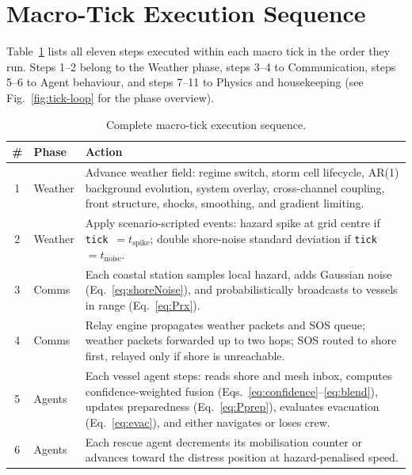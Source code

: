 \documentclass[cameraready]{Interspeech}
\begin{document}
\appendix

\section{Macro-Tick Execution Sequence}
\label{apx:tick}

Table~\ref{tab:tick-steps} lists all eleven steps executed within each macro tick in the order they run. Steps 1--2 belong to the Weather phase, steps 3--4 to Communication, steps 5--6 to Agent behaviour, and steps 7--11 to Physics and housekeeping (see Fig.~\ref{fig:tick-loop} for the phase overview).

\begin{table}[htbp]
    \caption{Complete macro-tick execution sequence.}
    \label{tab:tick-steps}
    \centering
    \small
    \begin{tabularx}{\textwidth}{@{}c l X@{}}
        \toprule
        \# & Phase & Action \\
        \midrule
        1 & Weather & Advance weather field: regime switch, storm cell lifecycle, AR(1) background evolution, system overlay, cross-channel coupling, front structure, shocks, smoothing, and gradient limiting. \\[2pt]
        2 & Weather & Apply scenario-scripted events: hazard spike at grid centre if \texttt{tick}~$= t_\text{spike}$; double shore-noise standard deviation if \texttt{tick}~$= t_\text{noise}$. \\[2pt]
        3 & Comms & Each coastal station samples local hazard, adds Gaussian noise (Eq.~\ref{eq:shoreNoise}), and probabilistically broadcasts to vessels in range (Eq.~\ref{eq:Prx}). \\[2pt]
        4 & Comms & Relay engine propagates weather packets and SOS queue; weather packets forwarded up to two hops; SOS routed to shore first, relayed only if shore is unreachable. \\[2pt]
        5 & Agents & Each vessel agent steps: reads shore and mesh inbox, computes confidence-weighted fusion (Eqs.~\ref{eq:confidence}--\ref{eq:blend}), updates preparedness (Eq.~\ref{eq:Pprep}), evaluates evacuation (Eq.~\ref{eq:evac}), and either navigates or loses crew. \\[2pt]
        6 & Agents & Each rescue agent decrements its mobilisation counter or advances toward the distress position at hazard-penalised speed. \\[2pt]

\end{tabularx}
\end{table}
\end{document}
